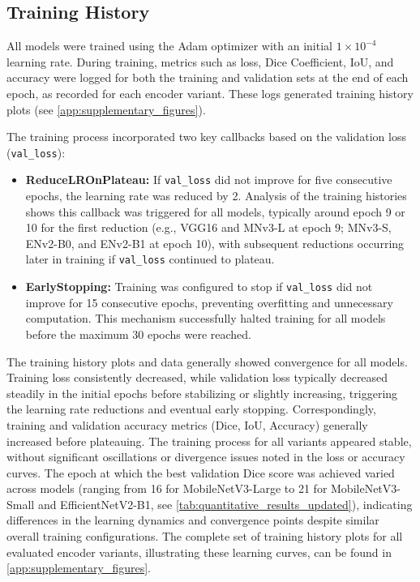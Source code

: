 \subsection{Training History}
All models were trained using the Adam optimizer with an initial $1 \times 10^{-4}$ learning rate. During training, metrics such as loss, Dice Coefficient, IoU, and accuracy were logged for both the training and validation sets at the end of each epoch, as recorded for each encoder variant. These logs generated training history plots (see \ref{app:supplementary_figures}).

The training process incorporated two key callbacks based on the validation loss (\texttt{val\_loss}):
\begin{itemize}
  \item \textbf{ReduceLROnPlateau:} If \texttt{val\_loss} did not improve for five consecutive epochs, the learning rate was reduced by 2. Analysis of the training histories shows this callback was triggered for all models, typically around epoch 9 or 10 for the first reduction (e.g., VGG16 and MNv3-L at epoch 9; MNv3-S, ENv2-B0, and ENv2-B1 at epoch 10), with subsequent reductions occurring later in training if \texttt{val\_loss} continued to plateau.
  \item \textbf{EarlyStopping:} Training was configured to stop if \texttt{val\_loss} did not improve for 15 consecutive epochs, preventing overfitting and unnecessary computation. This mechanism successfully halted training for all models before the maximum 30 epochs were reached.
\end{itemize}

The training history plots and data generally showed convergence for all models. Training loss consistently decreased, while validation loss typically decreased steadily in the initial epochs before stabilizing or slightly increasing, triggering the learning rate reductions and eventual early stopping. Correspondingly, training and validation accuracy metrics (Dice, IoU, Accuracy) generally increased before plateauing. The training process for all variants appeared stable, without significant oscillations or divergence issues noted in the loss or accuracy curves. The epoch at which the best validation Dice score was achieved varied across models (ranging from 16 for MobileNetV3-Large to 21 for MobileNetV3-Small and EfficientNetV2-B1, see \ref{tab:quantitative_results_updated}), indicating differences in the learning dynamics and convergence points despite similar overall training configurations. The complete set of training history plots for all evaluated encoder variants, illustrating these learning curves, can be found in \ref{app:supplementary_figures}.

